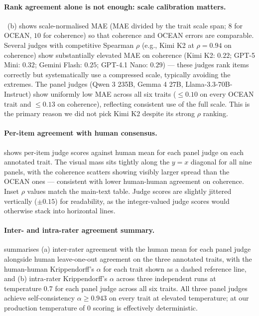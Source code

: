 \paragraph{Rank agreement alone is not enough: scale calibration matters.}
~(b) shows scale-normalised MAE (MAE divided by the trait scale span; $8$ for OCEAN, $10$ for coherence) so that coherence and OCEAN errors are comparable. Several judges with competitive Spearman $\rho$ (e.g., Kimi K2 at $\rho = 0.94$ on coherence) show substantially elevated MAE on coherence (Kimi K2: $0.22$; GPT-5 Mini: $0.32$; Gemini Flash: $0.25$; GPT-4.1 Nano: $0.29$) --- these judges rank items correctly but systematically use a compressed scale, typically avoiding the extremes. The panel judges (Qwen 3 235B, Gemma 4 27B, Llama-3.3-70B-Instruct) show uniformly low MAE across all six traits ($\leq 0.10$ on every OCEAN trait and $\leq 0.13$ on coherence), reflecting consistent use of the full scale. This is the primary reason we did not pick Kimi K2 despite its strong $\rho$ ranking.

\paragraph{Per-item agreement with human consensus.}
 shows per-item judge scores against human mean for each panel judge on each annotated trait. The visual mass sits tightly along the $y = x$ diagonal for all nine panels, with the coherence scatters showing visibly larger spread than the OCEAN ones --- consistent with lower human-human agreement on coherence. Inset $\rho$ values match the main-text table. Judge scores are slightly jittered vertically ($\pm 0.15$) for readability, as the integer-valued judge scores would otherwise stack into horizontal lines.

\paragraph{Inter- and intra-rater agreement summary.}
 summarises (a) inter-rater agreement with the human mean for each panel judge alongside human leave-one-out agreement on the three annotated traits, with the human-human Krippendorff's $\alpha$ for each trait shown as a dashed reference line, and (b) intra-rater Krippendorff's $\alpha$ across three independent runs at temperature $0.7$ for each panel judge across all six traits. All three panel judges achieve self-consistency $\alpha \geq 0.943$ on every trait at elevated temperature; at our production temperature of $0$ scoring is effectively deterministic.

